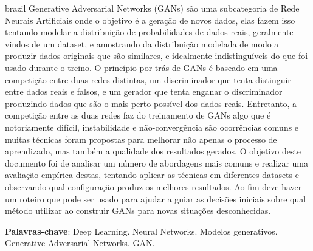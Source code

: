 \begin{resumo}[Resumo]
	\SingleSpacing
	\begin{otherlanguage*}{brazil}
		Generative Adversarial Networks (GANs) são uma subcategoria de Rede Neurais Artificiais onde o objetivo é a geração de novos dados, elas fazem isso tentando modelar a distribuição de probabilidades de dados reais, geralmente vindos de um dataset, e amostrando da distribuição modelada de modo a produzir dados originais que são similares, e idealmente indistinguíveis do que foi usado durante o treino.
    	O princípio por trás de GANs é baseado em uma competição entre duas redes distintas, um discriminador que tenta distinguir entre dados reais e falsos, e um gerador que tenta enganar o discriminador produzindo dados que são o mais perto possível dos dados reais.
    	Entretanto, a competição entre as duas redes faz do treinamento de GANs algo que é notoriamente difícil, instabilidade e não-convergência são ocorrências comuns e muitas técnicas foram propostas para melhorar não apenas o processo de aprendizado, mas também a qualidade dos resultados gerados.
    	O objetivo deste documento foi de analisar um número de abordagens mais comuns e realizar uma avaliação empírica destas, tentando aplicar as técnicas em diferentes datasets e observando qual configuração produz os melhores resultados. Ao fim deve haver um roteiro que pode ser usado para ajudar a guiar as decisões iniciais sobre qual método utilizar ao construir GANs para novas situações desconhecidas.
    	
    	\textbf{Palavras-chave}: Deep Learning. Neural Networks. Modelos generativos. Generative Adversarial Networks. GAN.
	\end{otherlanguage*}
\end{resumo}